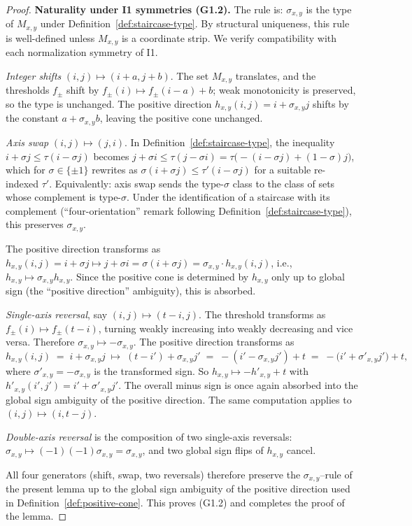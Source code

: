 \begin{proof}
\medskip
\noindent\textbf{Naturality under \textsc{I1} symmetries (G1.2).} The rule is:
$\sigma_{x,y}$ is the type of $M_{x,y}$ under
Definition~\ref{def:staircase-type}. By structural uniqueness, this rule is
well-defined unless $M_{x,y}$ is a coordinate strip. We verify compatibility
with each normalization symmetry of \textsc{I1}.

\emph{Integer shifts} $(i,j)\mapsto(i+a,j+b)$. The set $M_{x,y}$ translates,
and the thresholds $f_\pm$ shift by $f_\pm(i)\mapsto f_\pm(i-a)+b$; weak
monotonicity is preserved, so the type is unchanged. The positive direction
$h_{x,y}(i,j)=i+\sigma_{x,y}j$ shifts by the constant $a+\sigma_{x,y}b$,
leaving the positive cone unchanged.

\emph{Axis swap} $(i,j)\mapsto(j,i)$. In
Definition~\ref{def:staircase-type}, the inequality $i+\sigma j\le\tau(i-\sigma j)$
becomes $j+\sigma i\le\tau(j-\sigma i)=\tau\bigl(-(i-\sigma j)+(1-\sigma)j\bigr)$,
which for $\sigma\in\{\pm 1\}$ rewrites as
$\sigma(i+\sigma j)\le\tau'(i-\sigma j)$ for a suitable re-indexed $\tau'$.
Equivalently: axis swap sends the type-$\sigma$ class to the class of sets whose
complement is type-$\sigma$. Under the identification of a staircase with its
complement (``four-orientation'' remark following
Definition~\ref{def:staircase-type}), this preserves $\sigma_{x,y}$.

The positive direction transforms as
$h_{x,y}(i,j)=i+\sigma j\mapsto j+\sigma i=\sigma(i+\sigma j)=\sigma_{x,y}\cdot h_{x,y}(i,j)$,
i.e., $h_{x,y}\mapsto \sigma_{x,y} h_{x,y}$. Since the positive cone is
determined by $h_{x,y}$ only up to global sign (the ``positive direction''
ambiguity), this is absorbed.

\emph{Single-axis reversal}, say $(i,j)\mapsto(t-i,j)$. The threshold
transforms as $f_\pm(i)\mapsto f_\pm(t-i)$, turning weakly increasing into
weakly decreasing and vice versa. Therefore $\sigma_{x,y}\mapsto -\sigma_{x,y}$.
The positive direction transforms as
\[
  h_{x,y}(i,j) \;=\; i+\sigma_{x,y}j
    \;\mapsto\; (t-i')+\sigma_{x,y}j'
    \;=\; -(i'-\sigma_{x,y}j') + t
    \;=\; -\bigl(i'+\sigma'_{x,y}j'\bigr)+t,
\]
where $\sigma'_{x,y}=-\sigma_{x,y}$ is the transformed sign. So
$h_{x,y}\mapsto -h'_{x,y}+t$ with $h'_{x,y}(i',j')=i'+\sigma'_{x,y}j'$. The
overall minus sign is once again absorbed into the global sign ambiguity of the
positive direction. The same computation applies to $(i,j)\mapsto(i,t-j)$.

\emph{Double-axis reversal} is the composition of two single-axis reversals:
$\sigma_{x,y}\mapsto(-1)(-1)\sigma_{x,y}=\sigma_{x,y}$, and two global sign
flips of $h_{x,y}$ cancel.

\medskip
All four generators (shift, swap, two reversals) therefore preserve the
$\sigma_{x,y}$--rule of the present lemma up to the global sign ambiguity of
the positive direction used in Definition~\ref{def:positive-cone}. This proves
(G1.2) and completes the proof of the lemma.
\end{proof}

